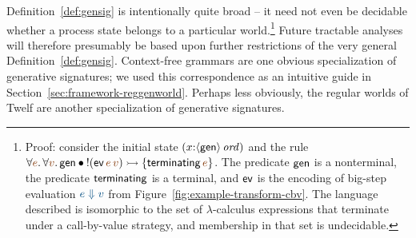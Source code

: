 \begin{center}
\quad
{}
\quad
{} 
\end{center}


Definition~\ref{def:gensig} is intentionally quite broad -- it need
not even be decidable whether a process state belongs to a particular
world.\footnote{Proof: consider the initial state
  $(x{:}{\langle {\sf gen} \rangle}\,{{\it ord}})$ and the rule $\forall
  \lf{e}.\,\forall\lf{v}.\,{\sf gen} \fuse {!}({\sf
    ev}\,\lf{e}\,\lf{v}) \lefti \{ {\sf terminating}\,\lf{e} \}$. The
  predicate ${\sf gen}$ is a nonterminal, the predicate ${\sf
    terminating}$ is a terminal, and ${\sf ev}$ is the encoding of
  big-step evaluation $\obj{e \Downarrow v}$ from
  Figure~\ref{fig:example-transform-cbv}.  The language described is
  isomorphic to the set of $\lambda$-calculus expressions that terminate
  under a call-by-value strategy,
  and membership in that set is undecidable.} Future tractable
analyses will therefore presumably be based upon further restrictions
of the very general Definition~\ref{def:gensig}.  Context-free
grammars are one obvious specialization of generative signatures; we
used this correspondence as an intuitive guide in
Section~\ref{sec:framework-reggenworld}.  Perhaps less obviously,
the regular worlds of Twelf \cite{schurmann00automating} are another
specialization of generative signatures.


